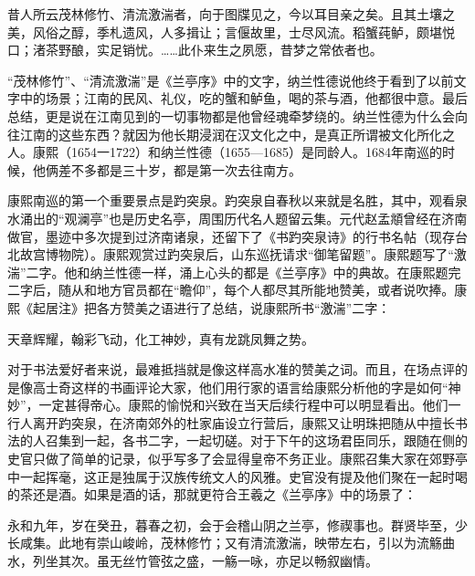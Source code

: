 
\begin{bookquote}昔人所云茂林修竹、清流激湍者，向于图牒见之，今以耳目亲之矣。且其土壤之美，风俗之醇，季札遗风，人多揖让；言偃故里，士尽风流。稻蟹莼鲈，颇堪悦口；渚茶野酿，实足销忧。……此仆来生之夙愿，昔梦之常依者也。\end{bookquote}


“茂林修竹”、“清流激湍”是《兰亭序》中的文字，纳兰性德说他终于看到了以前文字中的场景；江南的民风、礼仪，吃的蟹和鲈鱼，喝的茶与酒，他都很中意。最后总结，更是说在江南见到的一切事物都是他曾经魂牵梦绕的。纳兰性德为什么会向往江南的这些东西？就因为他长期浸润在汉文化之中，是真正所谓被文化所化之人。康熙（1654一1722）和纳兰性德（1655—1685）是同龄人。1684年南巡的时候，他俩差不多都是三十岁，都是第一次去往南方。



康熙南巡的第一个重要景点是趵突泉。趵突泉自春秋以来就是名胜，其中，观看泉水涌出的“观澜亭”也是历史名亭，周围历代名人题留云集。元代赵孟頫曾经在济南做官，墨迹中多次提到过济南诸泉，还留下了《书趵突泉诗》的行书名帖（现存台北故宫博物院）。康熙观赏过趵突泉后，山东巡抚请求“御笔留题”。康熙题写了“激湍”二字。他和纳兰性德一样，涌上心头的都是《兰亭序》中的典故。在康熙题完二字后，随从和地方官员都在“瞻仰”，每个人都尽其所能地赞美，或者说吹捧。康熙《起居注》把各方赞美之语进行了总结，说康熙所书“激湍”二字：



\begin{bookquote}天章辉耀，翰彩飞动，化工神妙，真有龙跳凤舞之势。\end{bookquote}


对于书法爱好者来说，最难抵挡就是像这样高水准的赞美之词。而且，在场点评的是像高士奇这样的书画评论大家，他们用行家的语言给康熙分析他的字是如何“神妙”，一定甚得帝心。康熙的愉悦和兴致在当天后续行程中可以明显看出。他们一行人离开趵突泉，在济南郊外的杜家庙设立行营后，康熙又让明珠把随从中擅长书法的人召集到一起，各书二字，一起切磋。对于下午的这场君臣同乐，跟随在侧的史官只做了简单的记录，似乎写多了会显得皇帝不务正业。康熙召集大家在郊野亭中一起挥毫，这正是独属于汉族传统文人的风雅。史官没有提及他们聚在一起时喝的茶还是酒。如果是酒的话，那就更符合王羲之《兰亭序》中的场景了：



\begin{bookquote}永和九年，岁在癸丑，暮春之初，会于会稽山阴之兰亭，修禊事也。群贤毕至，少长咸集。此地有崇山峻岭，茂林修竹；又有清流激湍，映带左右，引以为流觞曲水，列坐其次。虽无丝竹管弦之盛，一觞一咏，亦足以畅叙幽情。\end{bookquote}


